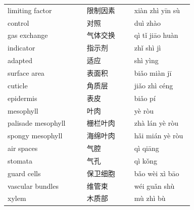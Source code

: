 \documentclass[11pt]{article}
\begin{document}
\begin{longtable}{@{}p{0.40\linewidth}p{0.24\linewidth}p{0.30\linewidth}@{}}
limiting factor & 限制因素 & xiàn zhì yīn sù \\
control & 对照 & duì zhào \\
gas exchange & 气体交换 & qì tǐ jiāo huàn \\
indicator & 指示剂 & zhǐ shì jì \\
adapted & 适应 & shì yìng \\
surface area & 表面积 & biǎo miàn jī \\
cuticle & 角质层 & jiǎo zhì céng \\
epidermis & 表皮 & biǎo pí \\
mesophyll & 叶肉 & yè ròu \\
palisade mesophyll & 栅栏叶肉 & zhà lán yè ròu \\
spongy mesophyll & 海绵叶肉 & hǎi mián yè ròu \\
air spaces & 气腔 & qì qiāng \\
stomata & 气孔 & qì kǒng \\
guard cells & 保卫细胞 & bǎo wèi xì bāo \\
vascular bundles & 维管束 & wéi guǎn shù \\
xylem & 木质部 & mù zhì bù \\
\end{longtable}
\end{document}
